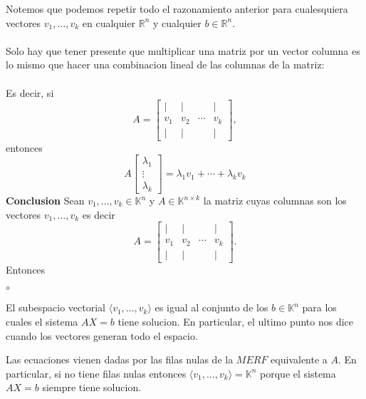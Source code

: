 \documentclass{article}
\theoremstyle{definition}
\theoremstyle{definition}
\theoremstyle{remark}
\begin{document}
Notemos que podemos repetir todo el razonamiento anterior para cualesquiera vectores $v_1, \dots ,v_k$ en cualquier $\mathbb{R}^n$ y cualquier $b \in \mathbb{R}^n$. \\\\ Solo hay que tener presente que multiplicar una matriz por un vector columna es lo mismo que hacer una combinacion lineal de las columnas de la matriz: \\\\ Es decir, si \[
  A=\begin{bmatrix} | & | & & | \\ v_1 & v_2 & \cdots & v_k \\ | & | && | \end{bmatrix},
\]
entonces \[
  A\begin{bmatrix}\lambda_1 \\ \vdots \\ \lambda_k \end{bmatrix} = \lambda_1 v_1 + \cdots + \lambda_k v_k
\]
\textbf{Conclusion} Sean $v_1, \dots ,v_k \in \mathbb{K}^n$ y $A \in \mathbb{K}^{n \times k}$ la matriz cuyas columnas son los vectores $v_1, \dots ,v_k$ es decir \[
  A=\begin{bmatrix} | &| & & | \\ v_1 & v_2 & \cdots & v_k \\ | & | && | \end{bmatrix}.
\]
Entonces 
\begin{list}{$\circ$}{}  
\item El subespacio vectorial $\langle v_1, \dots,v_k \rangle$ es igual al conjunto de los $b \in \mathbb{K}^n$ para los cuales el sistema $AX=b$ tiene solucion. En particular, el ultimo punto nos dice cuando los vectores generan todo el espacio.
\item Las ecuaciones vienen dadas por las filas nulas de la $MERF$ equivalente a $A$. En particular, si no tiene filas nulas entonces $\langle v_1, \dots ,v_k \rangle = \mathbb{K}^n$ porque el sistema $AX=b$ siempre tiene solucion.
\end{list}
\pagebreak
\end{document}
